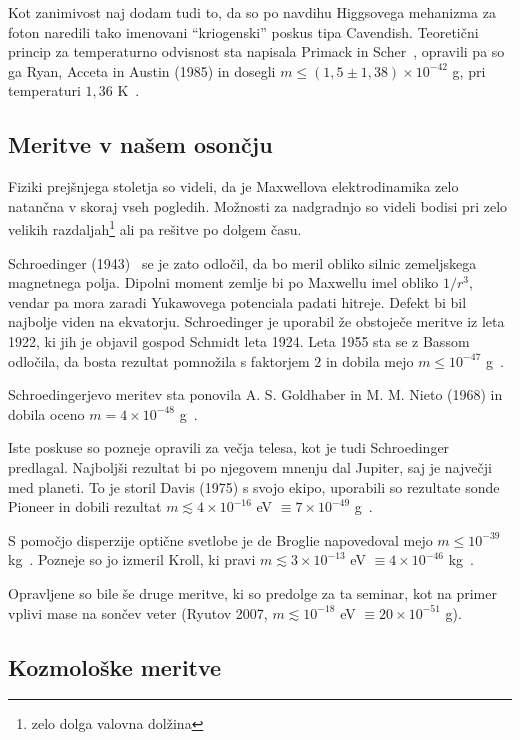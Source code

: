 \documentclass[a4paper, twocolumn, titlepage]{article}
\begin{document}
Kot zanimivost naj dodam tudi to, da so po navdihu Higgsovega mehanizma za foton naredili tako imenovani "`kriogenski"' poskus tipa Cavendish.
Teoretični princip za temperaturno odvisnost sta napisala Primack in Scher~\cite{nieto2},
opravili pa so ga Ryan, Acceta in Austin (1985) in dosegli $m \leq (1,5 \pm 1,38) \times 10^{-42}$ g, pri temperaturi
$1,36$ K~\cite{over}.

\subsection{Meritve v našem osončju}

Fiziki prejšnjega stoletja so videli, da je Maxwellova elektrodinamika zelo natančna v skoraj vseh pogledih. Možnosti za nadgradnjo so videli
bodisi pri zelo velikih razdaljah\footnote{zelo dolga valovna dolžina} ali pa rešitve po dolgem času.

Schroedinger (1943)~\cite{nieto1} se je zato odločil, da bo meril obliko silnic zemeljskega magnetnega polja. Dipolni moment zemlje bi po
Maxwellu imel obliko $1/r^3$, vendar pa mora zaradi Yukawovega potenciala padati hitreje. Defekt bi bil najbolje viden na ekvatorju.
Schroedinger je uporabil že obstoječe meritve iz leta 1922, ki jih je objavil gospod Schmidt leta 1924. Leta 1955 sta se z Bassom odločila,
da bosta rezultat pomnožila s faktorjem $2$ in dobila mejo $m \leq 10^{-47}$ g~\cite{nieto1}.

Schroedingerjevo meritev sta ponovila A. S. Goldhaber in M. M. Nieto (1968) in dobila oceno $m = 4 \times 10^{-48}$ g~\cite{nieto1, over}.

Iste poskuse so pozneje opravili za večja telesa, kot je tudi Schroedinger predlagal. Najboljši rezultat bi po njegovem mnenju dal Jupiter,
saj je največji med planeti. To je storil Davis (1975) s svojo ekipo, uporabili so rezultate sonde Pioneer in dobili rezultat
$m \lesssim 4\times10^{-16}$ eV $\equiv 7 \times 10^{-49}$ g~\cite{nieto2,over}.

S pomočjo disperzije optične svetlobe je de Broglie napovedoval mejo $m \leq 10^{-39}$ kg~\cite{nieto2}. Pozneje so jo izmeril Kroll,
ki pravi $m \lesssim 3 \times 10^{-13}$ eV $\equiv 4 \times 10^{-46}$ kg~\cite{nieto2}.

Opravljene so bile še druge meritve, ki so predolge za ta seminar, kot na primer vplivi mase na sončev veter (Ryutov 2007,
$m \lesssim 10^{-18}$ eV $\equiv 20\times10^{-51}$ g).

\subsection{Kozmološke meritve}
\end{document}
